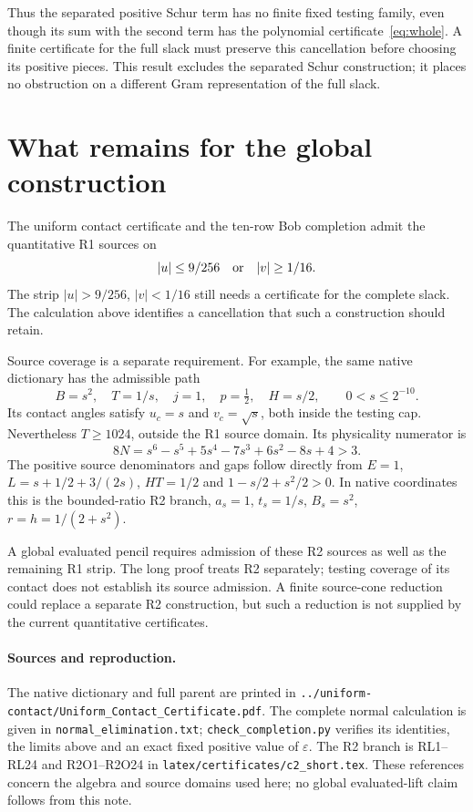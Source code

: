 \documentclass[11pt]{article}
\begin{document}
Thus the separated positive Schur term has no finite fixed testing
family, even though its sum with the second term has the polynomial
certificate~\eqref{eq:whole}. A finite certificate for the full slack
must preserve this cancellation before choosing its positive pieces.
This result excludes the separated Schur construction; it places no
obstruction on a different Gram representation of the full slack.

\section{What remains for the global construction}

The uniform contact certificate and the ten-row Bob completion admit
the quantitative R1 sources on
\[
 |u|\leq9/256\quad\hbox{or}\quad |v|\geq1/16.
\]
The strip $|u|>9/256$, $|v|<1/16$ still needs a certificate for the
complete slack. The calculation above identifies a cancellation that
such a construction should retain.

Source coverage is a separate requirement. For example, the same
native dictionary has the admissible path
\begin{equation}
 B=s^2,\quad T=1/s,\quad j=1,\quad p=\tfrac12,
 \quad H=s/2,\qquad 0<s\leq2^{-10}.                \label{eq:r2}
\end{equation}
Its contact angles satisfy $u_c=s$ and $v_c=\sqrt{s}$, both inside
the testing cap. Nevertheless $T\geq1024$, outside the R1 source
domain. Its physicality numerator is
\[
 8N=s^6-s^5+5s^4-7s^3+6s^2-8s+4>3.
\]
The positive source denominators and gaps follow directly from
$E=1$, $L=s+1/2+3/(2s)$, $HT=1/2$ and
$1-s/2+s^2/2>0$. In native coordinates this is the bounded-ratio R2
branch, $a_s=1$, $t_s=1/s$, $B_s=s^2$,
$r=h=1/(2+s^2)$.

A global evaluated pencil requires admission of these R2 sources as
well as the remaining R1 strip. The long proof treats R2 separately;
testing coverage of its contact does not establish its source
admission. A finite source-cone reduction could replace a separate
R2 construction, but such a reduction is not supplied by the current
quantitative certificates.

\paragraph{Sources and reproduction.}
The native dictionary and full parent are printed in
\texttt{../uniform-contact/Uniform\_Contact\_Certificate.pdf}.
The complete normal calculation is given in
\texttt{normal\_elimination.txt}; \texttt{check\_completion.py}
verifies its identities, the limits above and an exact fixed positive
value of $\varepsilon$. The R2 branch is RL1--RL24 and R2O1--R2O24
in \texttt{latex/certificates/c2\_short.tex}. These references concern
the algebra and source domains used here; no global evaluated-lift
claim follows from this note.
\end{document}
